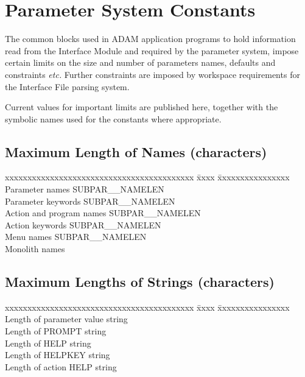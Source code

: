 \documentclass[twoside,11pt,nolof]{starlink}
\begin{document}
\newpage
\section{Parameter System Constants
\label{consts}}

The common blocks used in ADAM application programs to hold information read
from the Interface Module and required by the parameter system, impose certain
limits on the size and number of parameters names, defaults and constraints
\emph{etc.} Further constraints are imposed by workspace requirements for the
Interface File parsing system.

Current values for important limits are published here, together with
the symbolic names used for the constants where appropriate.

\subsection*{Maximum Length of Names (characters)}
\begin{center}
\begin{tabbing}
xxxxxxxxxxxxxxxxxxxxxxxxxxxxxxxxxxxxxxxxxx \= xxxx \= xxxxxxxxxxxxxxxx \kill
Parameter names    \> SUBPAR\_\_NAMELEN \\
Parameter keywords  \> SUBPAR\_\_NAMELEN \\
Action and program names    \> SUBPAR\_\_NAMELEN \\
Action keywords    \> SUBPAR\_\_NAMELEN \\
Menu names    \> SUBPAR\_\_NAMELEN \\
Monolith names  \\
\end{tabbing} \end{center}

\subsection*{Maximum Lengths of Strings (characters)}
\begin{center}
\begin{tabbing}
xxxxxxxxxxxxxxxxxxxxxxxxxxxxxxxxxxxxxxxxxx \= xxxx \= xxxxxxxxxxxxxxxx \kill
Length of parameter value string  \\
Length of PROMPT string    \\
Length of HELP string    \\
Length of HELPKEY string  \\
Length of action HELP string  \\
\end{tabbing} \end{center}
\end{document}
